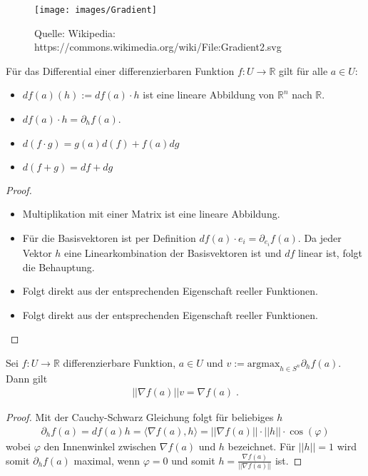 \begin{figure}[H]
      \centering
    \texttt{[image: images/Gradient]}
      \caption{Quelle: Wikipedia: https://commons.wikimedia.org/wiki/File:Gradient2.svg}
\end{figure}


\begin{Bemerkung}
\label{partial1}
Für das Differential einer differenzierbaren Funktion  $f: U \to \mathbb{R}$ gilt für alle $a \in U$:
\begin{itemize}
\item  $df(a) (h) :=  df(a) \cdot h$ ist eine lineare Abbildung von $\mathbb{R}^n$ nach $\mathbb{R}$.
\item $df(a)  \cdot h = \partial_h f(a)$. 
\item $d (f \cdot g) = g(a) d(f) + f(a) dg$
\item $d(f + g) = df + dg$
\end{itemize}
\end{Bemerkung}
\begin{proof}
\begin{itemize}
\item  Multiplikation mit einer Matrix ist eine lineare Abbildung.
\item Für die Basisvektoren ist per Definition $df(a)  \cdot e_i = \partial_{e_i} f(a)$. Da jeder Vektor $h$ eine Linearkombination der Basisvektoren ist und $df$ linear ist, folgt die Behauptung.
\item Folgt direkt aus der entsprechenden Eigenschaft reeller Funktionen.
\item Folgt direkt aus der entsprechenden Eigenschaft reeller Funktionen.
\end{itemize}
\end{proof}


\begin{Satz}
Sei   $f: U \to \mathbb{R}$ differenzierbare Funktion,  $a \in U$ und $v := \text{argmax}_{ h \in S^n} \partial_h f(a) $.
Dann gilt 
\begin{align*}
|| \nabla f(a) || v =  \nabla f(a) \; .
\end{align*} 
\end{Satz}
\begin{proof}
Mit der Cauchy-Schwarz Gleichung folgt für beliebiges $h$ 
\begin{align*}
\partial_h f(a) = df(a) h = \langle \nabla f(a) , h \rangle = || \nabla f(a)||  \cdot ||h|| \cdot \cos(\varphi) 
\end{align*} 
wobei $\varphi$ den Innenwinkel zwischen $\nabla f(a)$ und $h$ bezeichnet. Für $||h|| = 1$ wird somit $\partial_h f(a) $ maximal, wenn $\varphi = 0$ und somit $h =  \frac{\nabla f(a)}{||\nabla f(a)||}$ ist.
\end{proof}





